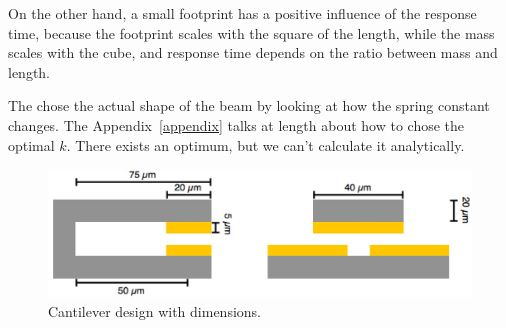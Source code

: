 On the other hand, a small footprint has a positive influence of the response time, because the footprint scales with the square of the length, while the mass scales with the cube, and response time depends on the ratio between mass and length.

The chose the actual shape of the beam by looking at how the spring constant changes.
The Appendix~\ref{appendix} talks at length about how to chose the optimal $k$.
There exists an optimum, but we can't calculate it analytically.

\begin{figure}[h]
	\centering
	\includegraphics[width=12cm]{fig/cant_design.jpg}
    \caption{Cantilever design with dimensions.}
\label{fig:cantilever_design}
\end{figure}
